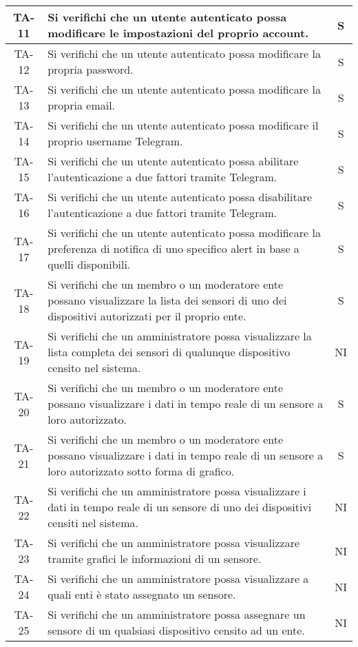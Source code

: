 \begin{center}
\begin{longtable}{|c|p{10cm}|c|}
			 \hline
			 TA-11 & Si verifichi che un utente autenticato possa modificare le impostazioni del proprio account. & S \\
			 \hline
			 TA-12 & Si verifichi che un utente autenticato possa modificare la propria password. & S \\
			 \hline
			 TA-13 & Si verifichi che un utente autenticato possa modificare la propria email. & S \\
			 \hline
			 TA-14 & Si verifichi che un utente autenticato possa modificare il proprio username Telegram. & S \\
			 \hline
			 TA-15 & Si verifichi che un utente autenticato possa abilitare l'autenticazione a due fattori tramite Telegram. & S \\
			 \hline
			 TA-16 & Si verifichi che un utente autenticato possa disabilitare l'autenticazione a due fattori tramite Telegram. & S \\
			 \hline
			 TA-17 & Si verifichi che un utente autenticato possa modificare la preferenza di notifica di uno specifico alert in base a quelli disponibili. & S \\
			 \hline
			 TA-18 & Si verifichi che un membro o un moderatore ente possano visualizzare la lista dei sensori di uno dei dispositivi autorizzati per il proprio ente. & S \\
			 \hline
			 TA-19 & Si verifichi che un amministratore possa visualizzare la lista completa dei sensori di qualunque dispositivo censito nel sistema. & NI \\
			 \hline
			 TA-20 & Si verifichi che un membro o un moderatore ente possano visualizzare i dati in tempo reale di un sensore a loro autorizzato. & S \\
			 \hline
			 TA-21 & Si verifichi che un membro o un moderatore ente possano visualizzare i dati in tempo reale di un sensore a loro autorizzato sotto forma di grafico. & S \\
			 \hline
			 TA-22 & Si verifichi che un amministratore possa visualizzare i dati in tempo reale di un sensore di uno dei dispositivi censiti nel sistema. & NI \\
			 \hline
			 TA-23 & Si verifichi che un amministratore possa visualizzare tramite grafici le informazioni di un sensore. & NI \\
			 \hline
			 TA-24 & Si verifichi che un amministratore possa visualizzare a quali enti è stato assegnato un sensore. & NI \\
			 \hline
			 TA-25 & Si verifichi che un amministratore possa assegnare un sensore di un qualsiasi dispositivo censito ad un ente. & NI \\

\end{longtable}
\end{center}
